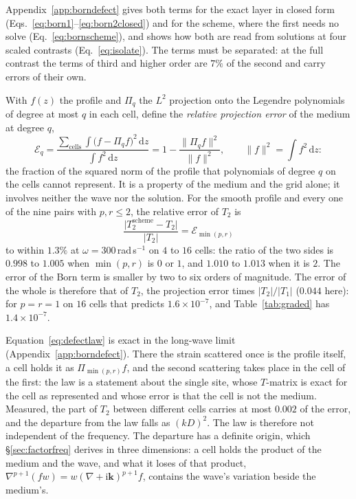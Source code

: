 \documentclass[11pt,a4paper]{article}
\newcommand{\bk}{\mathbf{k}}
\newcommand{\dd}{\mathrm{d}}
\begin{document}
Appendix~\ref{app:borndefect} gives both terms for the exact layer in closed form
(Eqs.~\eqref{eq:born1}--\eqref{eq:born2closed}) and for the scheme, where the first needs no solve
(Eq.~\eqref{eq:bornscheme}), and shows how both are read from solutions at four scaled contrasts
(Eq.~\eqref{eq:isolate}). The terms must be separated: at the full contrast the terms of third and
higher order are $7\%$ of the second and carry errors of their own.

With $f(z)$ the profile and $\Pi_q$
the $L^2$ projection onto the Legendre polynomials of degree at most $q$ in each cell, define the
\emph{relative projection error} of the medium at degree $q$,
\begin{equation}\label{eq:defect}
  \mathcal{E}_q=\frac{\sum_{\text{cells}}\int\bigl(f-\Pi_qf\bigr)^2\,\dd z}{\int f^2\,\dd z}
     =1-\frac{\lVert\Pi_qf\rVert^2}{\lVert f\rVert^2},\qquad \lVert f\rVert^2=\int f^2\,\dd z:
\end{equation}
the fraction of the squared norm of the profile that polynomials of degree $q$ on the cells cannot
represent. It is a property of the medium and the grid alone; it involves neither the wave nor the
solution.
For the smooth profile and every one of the nine pairs with $p,r\le2$, the relative error of $T_2$ is
\begin{equation}\label{eq:defectlaw}
  \frac{\lvert T_2^{\text{scheme}}-T_2\rvert}{\lvert T_2\rvert}=\mathcal{E}_{\min(p,r)}
\end{equation}
to within $1.3\%$ at $\omega=300$\,rad\,s$^{-1}$ on $4$ to $16$ cells: the ratio of the two sides is
$0.998$ to $1.005$ when $\min(p,r)$ is $0$ or $1$, and $1.010$ to $1.013$ when it is $2$. The error of the
Born term is smaller by two to six orders of magnitude. The error of the whole is therefore that of
$T_2$, the projection error times $\lvert T_2\rvert/\lvert T_1\rvert$ ($0.044$ here): for $p=r=1$ on $16$ cells
that predicts $1.6\times10^{-7}$, and Table~\ref{tab:graded} has $1.4\times10^{-7}$.

Equation~\eqref{eq:defectlaw} is exact in the long-wave limit (Appendix~\ref{app:borndefect}). There
the strain scattered once is the profile itself, a cell holds it as $\Pi_{\min(p,r)}f$, and the
second scattering takes place in the cell of the first: the law is a statement about the single site,
whose $T$-matrix is exact for the cell as represented and whose error is that the cell is not the
medium. Measured, the part of $T_2$ between different cells carries at most $0.002$ of the error, and
the departure from the law falls as $(kD)^2$. The law is therefore not independent of the frequency. The
departure has a definite origin, which \S\ref{sec:factorfreq} derives in three dimensions: a cell holds
the product of the medium and the wave, and what it loses of that product,
$\nabla^{p+1}(fw)=w(\nabla+\mathrm{i}\bk)^{p+1}f$, contains the wave's variation beside the medium's.
\end{document}
